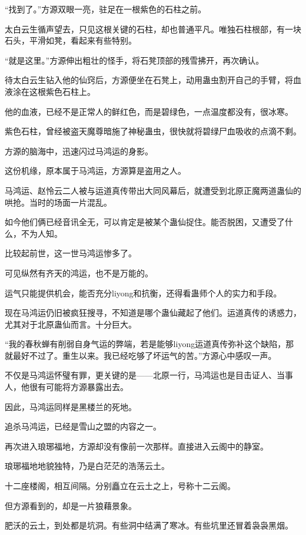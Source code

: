 
\begin{this_body}

“找到了。”方源双眼一亮，驻足在一根紫色的石柱之前。

太白云生循声望去，只见这根关键的石柱，却也普通平凡。唯独石柱根部，有一块石头，平滑如凳，看起来有些特别。

“就是这里。”方源伸出粗壮的怪手，将石凳顶部的残雪拂开，再次确认。

待太白云生钻入他的仙窍后，方源便坐在石凳上，动用蛊虫割开自己的手臂，将血液涂在这根紫色石柱上。

他的血液，已经不是正常人的鲜红色，而是碧绿色，一点温度都没有，很冰寒。

紫色石柱，曾经被盗天魔尊暗施了神秘蛊虫，很快就将碧绿尸血吸收的点滴不剩。

方源的脑海中，迅速闪过马鸿运的身影。

这份机缘，原本属于马鸿运，方源算是盗用之人。

马鸿运、赵怜云二人被与运道真传带出大同风幕后，就遭受到北原正魔两道蛊仙的哄抢。当时的场面一片混乱。

如今他们俩已经音讯全无，可以肯定是被某个蛊仙捉住。能否脱困，又遭受了什么，不为人知。

比较起前世，这一世马鸿运惨多了。

可见纵然有齐天的鸿运，也不是万能的。

运气只能提供机会，能否充分liyong和抗衡，还得看蛊师个人的实力和手段。

现在马鸿运仍旧被疯狂搜寻，不知道是哪个蛊仙藏起了他们。运道真传的诱惑力，尤其对于北原蛊仙而言。十分巨大。

“我的春秋蝉有削弱自身气运的弊端，若是能够liyong运道真传弥补这个缺陷，那就最好不过了。重生以来。我已经吃够了坏运气的苦。”方源心中感叹一声。

不仅是马鸿运怀璧有罪，更关键的是——北原一行，马鸿运也是目击证人、当事人，他很有可能将方源暴露出去。

因此，马鸿运同样是黑楼兰的死地。

追杀马鸿运，已经是雪山之盟的内容之一。

再次进入琅琊福地，方源却没有像前一次那样。直接进入云阁中的静室。

琅琊福地地貌独特，乃是白茫茫的浩荡云土。

十二座楼阁，相互间隔。分别矗立在云土之上，号称十二云阁。

但方源看到的，却是一片狼藉景象。

肥沃的云土，到处都是坑洞。有些洞中结满了寒冰。有些坑里还冒着袅袅黑烟。


\end{this_body}

